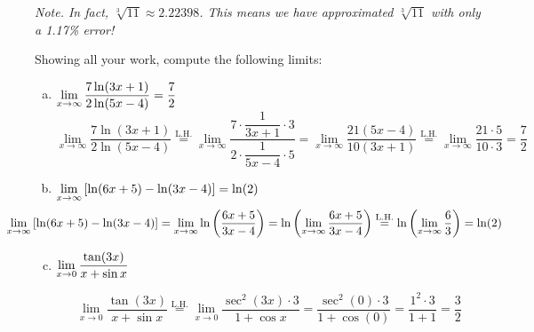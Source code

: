 \documentclass[12pt,letterpaper]{exam}
\newcommand{\lh}{\stackrel{\text{L.H.}}{=}}
\begin{document}
\begin{questions}
\begin{enumerate}[(a)]
	{\itshape\footnotesize Note. In fact, $\sqrt[3]{11} \approx 2.22398$. This means we have approximated $\sqrt[3]{11}$ with only a 1.17\% error!}
	\end{enumerate}



\newpage
\question[16] Showing all your work, compute the following limits: \par\vspace{0.3cm}
	\begin{enumerate}[(a)]
	\item $\displaystyle\lim_{x \to \infty} \dfrac{7 \ln(3x + 1)}{2 \ln(5x - 4)}= \dfrac{7}{2}$ \vfill
		\[
		\lim_{x \to \infty} \dfrac{7 \ln(3x + 1)}{2 \ln(5x - 4)} \lh \lim_{x \to \infty} \dfrac{7 \cdot \dfrac{1}{3x + 1} \cdot 3}{2 \cdot \dfrac{1}{5x - 4} \cdot 5}= \lim_{x \to \infty} \dfrac{21 (5x - 4)}{10(3x + 1)} \lh \lim_{x \to \infty} \dfrac{21 \cdot 5}{10 \cdot 3}= \dfrac{7}{2}
		\] \vfill
	
	\item $\displaystyle\lim_{x \to \infty} \left[ \ln(6x + 5) - \ln(3x - 4) \right]= \ln(2)$ \vfill
		\[
		\hspace{-1.5cm} \lim_{x \to \infty} \left[ \ln(6x + 5) - \ln(3x - 4) \right]= \lim_{x \to \infty} \ln \left( \dfrac{6x + 5}{3x - 4} \right)= \ln \left( \lim_{x \to \infty} \dfrac{6x + 5}{3x - 4} \right) \lh \ln \left( \lim_{x \to \infty} \dfrac{6}{3} \right)= \ln(2)
		\] \vfill\vspace{1.6cm}
	
	\newpage
	
	\phantom{} \par
	\item $\displaystyle\lim_{x \to 0} \dfrac{\tan(3x)}{x + \sin x}$ \par\vspace{2.25cm}
		\[
		\lim_{x \to 0} \dfrac{\tan(3x)}{x + \sin x} \lh \lim_{x \to 0} \dfrac{\sec^2(3x) \cdot 3}{1 + \cos x}= \dfrac{\sec^2(0) \cdot 3}{1 + \cos(0)}= \dfrac{1^2  \cdot 3}{1 + 1}= \dfrac{3}{2}
		\] \par\vspace{2.25cm}
	

\end{enumerate}
\end{questions}
\end{document}
